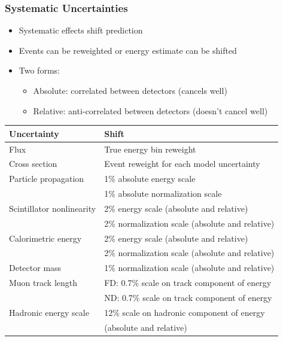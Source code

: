 \documentclass[10pt,professionalfonts,xcolor=table]{beamer}
\begin{document}
\begin{frame}
\frametitle{Systematic Uncertainties}
\begin{itemize}
\item Systematic effects shift prediction
\item Events can be reweighted or energy estimate can be shifted
\item Two forms:
  \begin{itemize}
  \item Absolute: correlated between detectors (cancels well)
  \item Relative: anti-correlated between detectors (doesn't cancel well)
  \end{itemize}
\end{itemize}
\gap
\begin{center}
\small
\begin{tabular}{ l | l }
 \textcolor{custom_red}{Uncertainty} & \textcolor{custom_red}{Shift} \\ \hline
Flux & True energy bin reweight \\ \hline
Cross section & Event reweight for each model uncertainty \\ \hline
Particle propagation & 1\% absolute energy scale  \\
&  1\% absolute normalization scale \\ \hline
Scintillator nonlinearity & 2\% energy scale (absolute and relative)  \\
&  2\% normalization scale (absolute and relative) \\ \hline
Calorimetric energy & 2\% energy scale (absolute and relative)  \\
&  2\% normalization scale (absolute and relative) \\ \hline
Detector mass &  1\% normalization scale (absolute and relative) \\ \hline
Muon track length &  FD: 0.7\% scale on track component of energy\\
 &  ND: 0.7\% scale on track component of energy\\ \hline
Hadronic energy scale &  12\% scale on hadronic component of energy \\
& (absolute and relative)\\
\end{tabular}

\end{center}


\end{frame}
\end{document}
